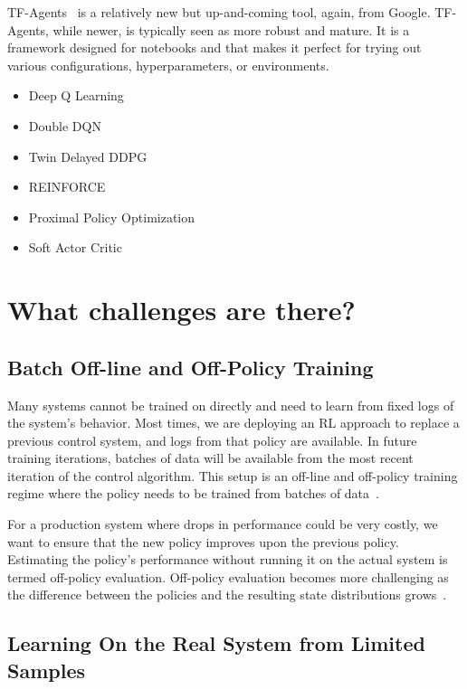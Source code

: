 \documentclass[letterpaper, 10 pt]{IEEEconf}
\begin{document}
TF-Agents~\cite{TFAgents} is a relatively new but up-and-coming tool, again, from
Google.  TF-Agents, while newer, is typically seen as more robust and
mature. It is a framework designed for notebooks and that makes it
perfect for trying out various configurations, hyperparameters, or
environments.

\begin{itemize}
	\item Deep Q Learning
	\item Double DQN
	\item Twin Delayed DDPG
	\item REINFORCE
	\item Proximal Policy Optimization
	\item Soft Actor Critic
\end{itemize}

\section{What challenges are there?}

\subsection{Batch Off-line and Off-Policy Training}

Many systems cannot be trained on directly and need to learn from
fixed logs of the system’s behavior. Most times, we are deploying an
RL approach to replace a previous control system, and logs from that
policy are available. In future training iterations, batches of data
will be available from the most recent iteration of the control
algorithm. This setup is an off-line and off-policy training regime
where the policy needs to be trained from batches of data~\cite{deepmind2019}.

For a production system where drops in performance could be very
costly, we want to ensure that the new policy improves upon the
previous policy. Estimating the policy’s performance without running
it on the actual system is termed off-policy evaluation. Off-policy
evaluation becomes more challenging as the difference between the
policies and the resulting state distributions grows~\cite{deepmind2019}.

\subsection{Learning On the Real System from Limited Samples}
\end{document}
